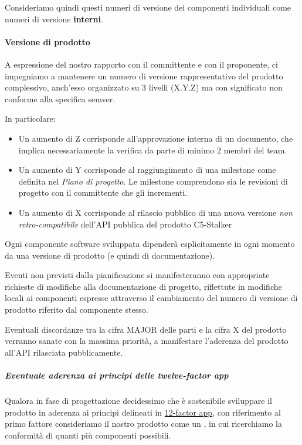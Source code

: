 \documentclass[../norme-di-progetto.tex]{subfiles}
\begin{document}
Consideriamo quindi questi numeri di versione dei componenti individuali come numeri di versione \textbf{interni}.

\paragraph{Versione di prodotto}%
\label{par:versione_di_prodotto}

A espressione del nostro rapporto con il committente e con il proponente, ci impegniamo a mantenere un numero di versione rappresentativo del prodotto complessivo, anch'esso organizzato su 3 livelli (X.Y.Z) ma con significato non conforme alla specifica semver.

In particolare:

\begin{itemize}
  \item Un aumento di Z corrisponde all'approvazione interna di un documento, che implica necessariamente la verifica da parte di minimo 2 membri del team.
  \item Un aumento di Y corrisponde al raggiungimento di una milestone come definita nel \textit{Piano di progetto}. Le milestone comprendono sia le revisioni di progetto con il committente che gli incrementi.
  \item Un aumento di X corrisponde al rilascio pubblico di una nuova versione \textit{non retro-compatibile} dell'API pubblica del prodotto C5-Stalker
\end{itemize}

Ogni componente software sviluppata dipenderà esplicitamente in ogni momento da una versione di prodotto (e quindi di documentazione).

Eventi non previsti dalla pianificazione si manifesteranno con appropriate richieste di modifiche alla documentazione di progetto, riflettute in modifiche locali ai componenti espresse attraverso il cambiamento del numero di versione di prodotto riferito dal componente stesso.

Eventuali discordanze tra la cifra MAJOR delle parti e la cifra X del prodotto verranno sanate con la massima priorità, a manifestare l'aderenza del prodotto all'API rilasciata pubblicamente.

\subparagraph{Eventuale aderenza ai principi delle twelve-factor app}%
\label{subp:eventuale_aderenza_ai_principi_delle_twelve-factor_app}

Qualora in fase di progettazione decidessimo che è sostenibile sviluppare il prodotto in aderenza ai principi delineati in \href{https://12factor.net/codebase}{12-factor app}, con riferimento al primo fattore consideriamo il nostro prodotto come un , in cui ricerchiamo la conformità di quanti più componenti possibili.
\end{document}
